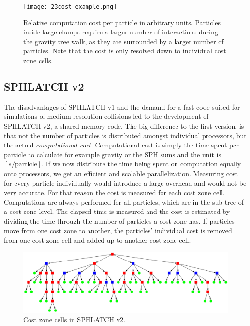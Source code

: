 \begin{figure}[htbp]
\begin{center}
\texttt{[image: 23cost\_example.png]}
\caption{Relative computation cost per particle in arbitrary units. Particles inside large clumps require a larger number of interactions during the gravity tree walk, as they are surrounded by a larger number of particles. Note that the cost is only resolved down to individual cost zone cells.}
\label{ch02_fig23}
\end{center}
\end{figure}

\subsection{SPHLATCH v2}
The disadvantages of SPHLATCH v1 and the demand for a fast code suited for simulations of medium resolution collisions led to the development of SPHLATCH v2, a shared memory code. The big difference to the first version, is that not the number of particles is distributed amongst individual processors, but the actual \emph{computational cost}. Computational cost is simply the time spent per particle to calculate for example gravity or the SPH sums and the unit is $[s / \text{particle}]$. If we now distribute the time being spent on computation equally onto processors, we get an efficient and scalable parallelization. Measuring cost for every particle individually would introduce a large overhead and would not be very accurate. For that reason the cost is measured for each cost zone cell. Computations are always performed for all particles, which are in the sub tree of a cost zone level. The elapsed time is measured and the cost is estimated by dividing the time through the number of particles a cost zone has. If particles move from one cost zone to another, the particles' individual cost is removed from one cost zone cell and added up to another cost zone cell.

\begin{figure}[htbp]
\begin{center}
\includegraphics[scale=0.3]{27algo_quadtree_sphlatchv2.pdf}
\caption{Cost zone cells in SPHLATCH v2.}
\label{ch02_fig27}
\end{center}
\end{figure}

